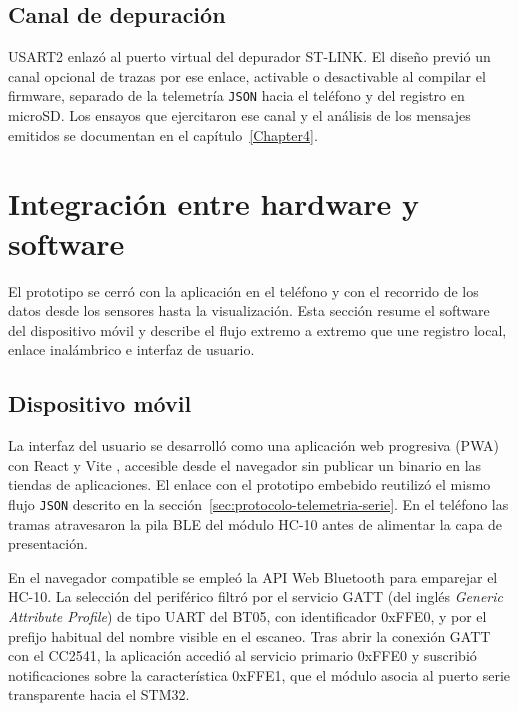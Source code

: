 \subsection{Canal de depuración}

USART2 enlazó al puerto virtual del depurador ST-LINK. El diseño previó un canal opcional de trazas por ese enlace, activable o desactivable al compilar el firmware, separado de la telemetría \texttt{JSON} hacia el teléfono y del registro en microSD. Los ensayos que ejercitaron ese canal y el análisis de los mensajes emitidos se documentan en el capítulo~\ref{Chapter4}.

\section{Integración entre hardware y software}
\label{sec:integracion-hw-sw}

El prototipo se cerró con la aplicación en el teléfono y con el recorrido de los datos desde los sensores hasta la visualización. Esta sección resume el software del dispositivo móvil y describe el flujo extremo a extremo que une registro local, enlace inalámbrico e interfaz de usuario.

\subsection{Dispositivo móvil}
\label{sec:dispositivo-movil}

La interfaz del usuario se desarrolló como una aplicación web progresiva (PWA) con React \citep{react} y Vite \citep{vite}, accesible desde el navegador sin publicar un binario en las tiendas de aplicaciones. El enlace con el prototipo embebido reutilizó el mismo flujo \texttt{JSON} descrito en la sección~\ref{sec:protocolo-telemetria-serie}. En el teléfono las tramas atravesaron la pila BLE del módulo HC-10 antes de alimentar la capa de presentación.

En el navegador compatible se empleó la API Web Bluetooth \citep{w3c_web_bluetooth} para emparejar el HC-10. La selección del periférico filtró por el servicio GATT (del inglés \textit{Generic Attribute Profile}) de tipo UART del BT05, con identificador 0xFFE0, y por el prefijo habitual del nombre visible en el escaneo. Tras abrir la conexión GATT con el CC2541, la aplicación accedió al servicio primario 0xFFE0 y suscribió notificaciones sobre la característica 0xFFE1, que el módulo asocia al puerto serie transparente hacia el STM32.

